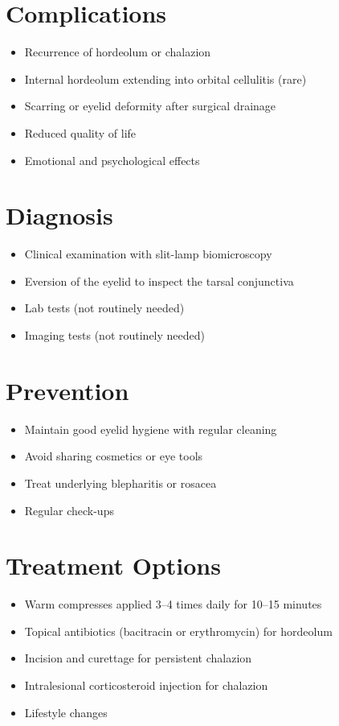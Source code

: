 \section{Complications}
\begin{itemize}[noitemsep]
  \item Recurrence of hordeolum or chalazion
  \item Internal hordeolum extending into orbital cellulitis (rare)
  \item Scarring or eyelid deformity after surgical drainage
  \item Reduced quality of life
  \item Emotional and psychological effects
\end{itemize}

\section{Diagnosis}
\begin{itemize}[noitemsep]
  \item Clinical examination with slit-lamp biomicroscopy
  \item Eversion of the eyelid to inspect the tarsal conjunctiva
  \item Lab tests (not routinely needed)
  \item Imaging tests (not routinely needed)
\end{itemize}

\section{Prevention}
\begin{itemize}[noitemsep]
  \item Maintain good eyelid hygiene with regular cleaning
  \item Avoid sharing cosmetics or eye tools
  \item Treat underlying blepharitis or rosacea
  \item Regular check-ups
\end{itemize}

\section{Treatment Options}
\begin{itemize}[noitemsep]
  \item Warm compresses applied 3--4 times daily for 10--15 minutes
  \item Topical antibiotics (bacitracin or erythromycin) for hordeolum
  \item Incision and curettage for persistent chalazion
  \item Intralesional corticosteroid injection for chalazion
  \item Lifestyle changes
\end{itemize}

